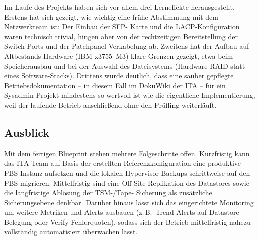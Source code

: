 Im Laufe des Projekts haben sich vor allem drei Lerneffekte
herausgestellt. Erstens hat sich gezeigt, wie wichtig eine frühe
Abstimmung mit dem Netzwerkteam ist: Der Einbau der \ac{SFP}-
Karte und die \ac{LACP}-Konfiguration waren technisch trivial,
hingen aber von der rechtzeitigen Bereitstellung der Switch-Ports
und der Patchpanel-Verkabelung ab. Zweitens hat der Aufbau auf
Altbestands-Hardware (IBM x3755~M3) klare Grenzen gezeigt, etwa
beim Speicherausbau und bei der Auswahl des Dateisystems
(Hardware-\ac{RAID} statt eines Software-Stacks). Drittens wurde
deutlich, dass eine sauber gepflegte Betriebsdokumentation -- in
diesem Fall im DokuWiki der \ac{ITA} -- für ein Sysadmin-Projekt
mindestens so wertvoll ist wie die eigentliche Implementierung,
weil der laufende Betrieb anschließend ohne den Prüfling
weiterläuft.



\subsection{Ausblick}
\label{sec:Ausblick}

Mit dem fertigen Blueprint stehen mehrere Folgeschritte offen.
Kurzfristig kann das \ac{ITA}-Team auf Basis der erstellten
Referenzkonfiguration eine produktive \ac{PBS}-Instanz
aufsetzen und die lokalen Hypervisor-Backups schrittweise auf den
\ac{PBS} migrieren. Mittelfristig sind eine Off-Site-Replikation
des Datastores sowie die langfristige Ablösung der \ac{TSM}-/Tape-
Sicherung als zusätzliche Sicherungsebene denkbar. Darüber hinaus
lässt sich das eingerichtete Monitoring um weitere Metriken und
Alerts ausbauen (z.\,B.\ Trend-Alerts auf Datastore-Belegung
oder Verify-Fehlerquoten), sodass sich der Betrieb mittelfristig
nahezu vollständig automatisiert überwachen lässt.

